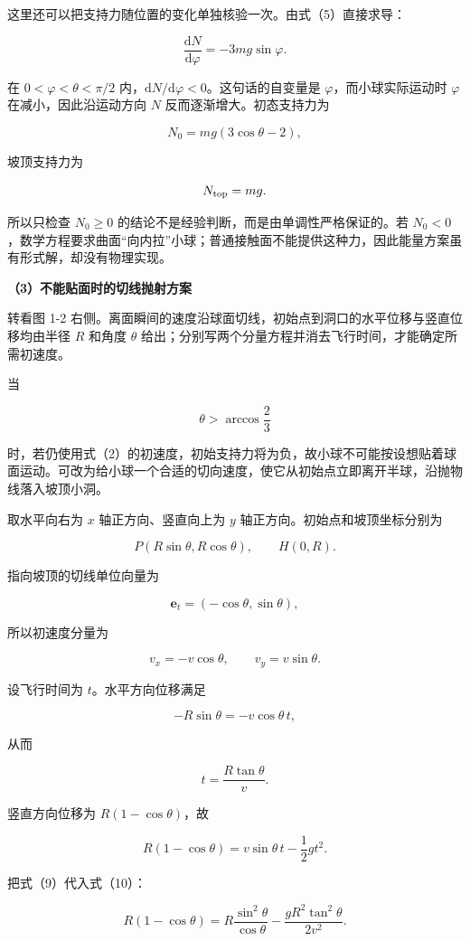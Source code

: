 \documentclass[12pt,a4paper,UTF8]{ctexart}
\begin{document}
这里还可以把支持力随位置的变化单独核验一次。由式（5）直接求导：

\[\frac{\mathrm dN}{\mathrm d\varphi}=-3mg\sin\varphi. \tag{6a}\]

在 \(0<\varphi<\theta<\pi/2\)
内，\(\mathrm dN/\mathrm d\varphi<0\)。这句话的自变量是
\(\varphi\)，而小球实际运动时 \(\varphi\) 在减小，因此沿运动方向 \(N\)
反而逐渐增大。初态支持力为

\[N_0=mg(3\cos\theta-2),\]

坡顶支持力为

\[N_{\rm top}=mg.\]

所以只检查 \(N_0\geq0\) 的结论不是经验判断，而是由单调性严格保证的。若
\(N_0<0\)，数学方程要求曲面``向内拉''小球；普通接触面不能提供这种力，因此能量方案虽有形式解，却没有物理实现。

\textbf{（3）不能贴面时的切线抛射方案}

转看图 1-2
右侧。离面瞬间的速度沿球面切线，初始点到洞口的水平位移与竖直位移均由半径
\(R\) 和角度 \(\theta\)
给出；分别写两个分量方程并消去飞行时间，才能确定所需初速度。

当

\[\theta>\arccos\frac23 \tag{7}\]

时，若仍使用式（2）的初速度，初始支持力将为负，故小球不可能按设想贴着球面运动。可改为给小球一个合适的切向速度，使它从初始点立即离开半球，沿抛物线落入坡顶小洞。

取水平向右为 \(x\) 轴正方向、竖直向上为 \(y\)
轴正方向。初始点和坡顶坐标分别为

\[P(R\sin\theta,R\cos\theta),\qquad H(0,R).\]

指向坡顶的切线单位向量为

\[\boldsymbol e_t=(-\cos\theta,\sin\theta),\]

所以初速度分量为

\[v_x=-v\cos\theta,\qquad v_y=v\sin\theta. \tag{8}\]

设飞行时间为 \(t\)。水平方向位移满足

\[-R\sin\theta=-v\cos\theta\,t,\]

从而

\[t=\frac{R\tan\theta}{v}. \tag{9}\]

竖直方向位移为 \(R(1-\cos\theta)\)，故

\[R(1-\cos\theta)=v\sin\theta\,t-\frac12gt^2. \tag{10}\]

把式（9）代入式（10）：

\[R(1-\cos\theta)
=R\frac{\sin^2\theta}{\cos\theta}
-\frac{gR^2\tan^2\theta}{2v^2}. \tag{11}\]
\end{document}
